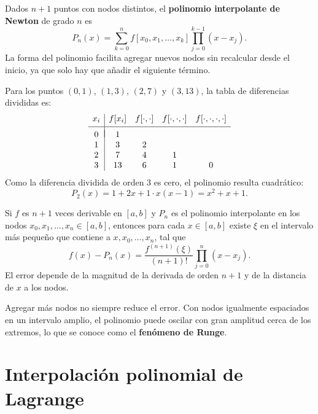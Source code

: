 \documentclass[a4,11pt]{aleph-notas}
\begin{document}
\begin{defi}
    Dados $n+1$ puntos con nodos distintos, el \textbf{polinomio interpolante de Newton} de grado $n$ es
    \[
        P_n(x)
        =
        \sum_{k=0}^{n}f[x_0,x_1,\ldots,x_k]\prod_{j=0}^{k-1}(x-x_j).
    \]
    La forma del polinomio facilita agregar nuevos nodos sin recalcular desde el inicio, ya que solo hay que añadir el siguiente término.
\end{defi}

\begin{ejem}
    Para los puntos $(0,1)$, $(1,3)$, $(2,7)$ y $(3,13)$, la tabla de diferencias divididas es:
    \[
        \begin{array}{c|cccc}
            x_i & f[x_i] & f[\cdot,\cdot] & f[\cdot,\cdot,\cdot] & f[\cdot,\cdot,\cdot,\cdot]\\[1mm]
            \hline\\[-3mm]
            0 & 1 &   &   &  \\
            1 & 3 & 2 &   &  \\
            2 & 7 & 4 & 1 &  \\
            3 & 13& 6 & 1 & 0\\
        \end{array}
    \]
    Como la diferencia dividida de orden 3 es cero, el polinomio resulta cuadrático:
    \[
        P_2(x)=1+2x+1\cdot x(x-1)=x^2+x+1.
    \]
\end{ejem}

\begin{defi}
    Si $f$ es $n+1$ veces derivable en $[a,b]$ y $P_n$ es el polinomio interpolante en los nodos $x_0,x_1,\ldots,x_n\in[a,b]$, entonces para cada $x\in[a,b]$ existe $\xi$ en el intervalo más pequeño que contiene a $x,x_0,\ldots,x_n$, tal que
    \[
        f(x)-P_n(x)
        =
        \frac{f^{(n+1)}(\xi)}{(n+1)!}
        \prod_{j=0}^{n}(x-x_j).
    \]
    El error depende de la magnitud de la derivada de orden $n+1$ y de la distancia de $x$ a los nodos.
\end{defi}

\begin{advertencia}
    Agregar más nodos no siempre reduce el error. Con nodos igualmente espaciados en un intervalo amplio, el polinomio puede oscilar con gran amplitud cerca de los extremos, lo que se conoce como el \textbf{fenómeno de Runge}.
\end{advertencia}


\section{Interpolación polinomial de Lagrange}
\end{document}
